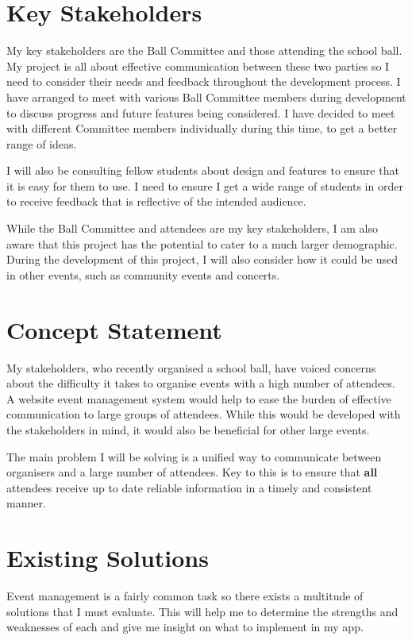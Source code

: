 \documentclass[a4paper,oneside,12pt,draft]{report}
\begin{document}
	\section{Key Stakeholders}
	My key stakeholders are the Ball Committee and those attending the school ball. My project is all about effective communication between these two parties so I need to consider their needs and feedback throughout the development process. I have arranged to meet with various Ball Committee members during development to discuss progress and future features being considered. I have decided to meet with different Committee members individually during this time, to get a better range of ideas.

	I will also be consulting fellow students about design and features to ensure that it is easy for them to use. I need to ensure I get a wide range of students in order to receive feedback that is reflective of the intended audience.

	While the Ball Committee and attendees are my key stakeholders, I am also aware that this project has the potential to cater to a much larger demographic. During the development of this project, I will also consider how it could be used in other events, such as community events and concerts.

	\section{Concept Statement}
	My stakeholders, who recently organised a school ball, have voiced concerns about the difficulty it takes to organise events with a high number of attendees. A website event management system would help to ease the burden of effective communication to large groups of attendees. While this would be developed with the stakeholders in mind, it would also be beneficial for other large events.

    The main problem I will be solving is a unified way to communicate between organisers and a large number of attendees. Key to this is to ensure that \textbf{all} attendees receive up to date reliable information in a timely and consistent manner.

	\section{Existing Solutions}
	Event management is a fairly common task so there exists a multitude of solutions that I must evaluate. This will help me to determine the strengths and weaknesses of each and give me insight on what to implement in my app.
\end{document}
